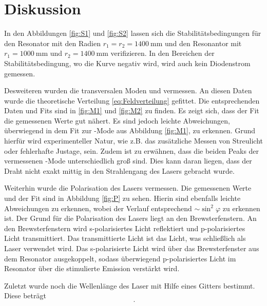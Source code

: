 

\section{Diskussion}

In den Abbildungen \ref{fig:S1} und \ref{fig:S2} lassen sich die
Stabilitätsbedingungen für den Resonator mit den Radien $r_1 = r_2 =
\SI{1400}{\mm}$ und den Resonantor mit
$r_1 = \SI{1000}{\mm}$ und $r_2 = \SI{1400}{\mm}$ verifizieren.
In den Bereichen der Stabilitätsbedingung, wo die Kurve negativ wird, wird auch
kein Diodenstrom gemessen.

Desweiteren wurden die transversalen Moden \TEMN und \TEME vermessen.
An diesen Daten wurde die theoretische Verteilung \ref{eq:Feldverteilung}
gefittet.
Die entsprechenden Daten und Fits sind in \ref{fig:M1} und \ref{fig:M2} zu
finden. Es zeigt sich, dass der Fit die gemessenen Werte gut nähert.
Es sind jedoch leichte Abweichungen, überwiegend in dem Fit zur \TEME-Mode aus
Abbildung \ref{fig:M1}, zu erkennen.
Grund hierfür wird experimenteller Natur, wie z.B. das zusätzliche Messen von
Streulicht oder fehlerhafte Justage, sein.
Zudem ist zu erwähnen, dass die beiden Peaks der vermessenen \TEME-Mode
unterschiedlich groß sind.
Dies kann daran liegen, dass der Draht nicht exakt mittig in den Strahlengang
des Lasers gebracht wurde.

Weiterhin wurde die Polarisation des Lasers vermessen.
Die gemessenen Werte und der Fit sind in Abbildung \ref{fig:P} zu sehen.
Hierin sind ebenfalls leichte Abweichungen zu erkennen, wobei der Verlauf
entsprechend $\sim \sin^2\varphi$ zu erkennen ist.
Der Grund für die Polarisation des Lasers liegt an den Brewsterfenstern.
An den Brewsterfenstern wird s-polarisiertes Licht reflektiert und
p-polarisiertes Licht transmittiert.
Das transmittierte Licht ist das Licht, was schließlich als Laser verwendet wird.
Das s-polarisierte Licht wird über das Brewsterfenster aus dem Resonator
ausgekoppelt, sodass überwiegend p-polarisiertes Licht im Resonator
über die stimulierte Emission verstärkt wird.

Zuletzt wurde noch die Wellenlänge des Laser mit Hilfe eines Gitters bestimmt.
Diese beträgt
\begin{equation}
	 ~.
\end{equation}
